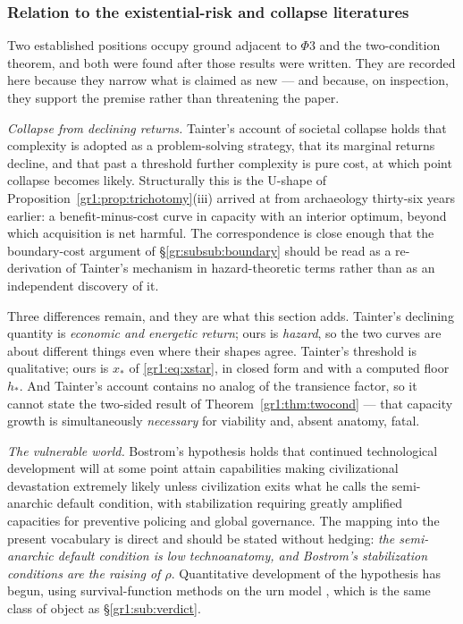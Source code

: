 \documentclass[11pt]{article}
\numberwithin{equation}{section}
\theoremstyle{plain}
\theoremstyle{definition}
\theoremstyle{remark}
\begin{document}
\subsubsection{Relation to the existential-risk and collapse
literatures}\label{gr:subsub:xrisk}

Two established positions occupy ground adjacent to $\Phi3$ and the
two-condition theorem, and both were found after those results were
written. They are recorded here because they narrow what is claimed as
new --- and because, on inspection, they support the premise rather than
threatening the paper.

\emph{Collapse from declining returns.} Tainter's account of societal
collapse \cite{Tainter88} holds that complexity is adopted as a
problem-solving strategy, that its marginal returns decline, and that
past a threshold further complexity is pure cost, at which point
collapse becomes likely. Structurally this is the U-shape of
Proposition~\ref{gr1:prop:trichotomy}(iii) arrived at from archaeology
thirty-six years earlier: a benefit-minus-cost curve in capacity with an
interior optimum, beyond which acquisition is net harmful. The
correspondence is close enough that the boundary-cost argument of
\S\ref{gr:subsub:boundary} should be read as a re-derivation of
Tainter's mechanism in hazard-theoretic terms rather than as an
independent discovery of it.

Three differences remain, and they are what this section adds. Tainter's
declining quantity is \emph{economic and energetic return}; ours is
\emph{hazard}, so the two curves are about different things even where
their shapes agree. Tainter's threshold is qualitative; ours is
$x_\ast$ of \eqref{gr1:eq:xstar}, in closed form and with a computed
floor $h_\ast$. And Tainter's account contains no analog of the
transience factor, so it cannot state the two-sided result of
Theorem~\ref{gr1:thm:twocond} --- that capacity growth is simultaneously
\emph{necessary} for viability and, absent anatomy, fatal.

\emph{The vulnerable world.} Bostrom's hypothesis \cite{Bostrom19} holds
that continued technological development will at some point attain
capabilities making civilizational devastation extremely likely unless
civilization exits what he calls the semi-anarchic default condition,
with stabilization requiring greatly amplified capacities for preventive
policing and global governance. The mapping into the present vocabulary
is direct and should be stated without hedging: \emph{the semi-anarchic
default condition is low technoanatomy, and Bostrom's stabilization
conditions are the raising of $\rho$}. Quantitative development of the
hypothesis has begun, using survival-function methods on the urn model
\cite{EF24}, which is the same class of object as
\S\ref{gr1:sub:verdict}.
\end{document}
